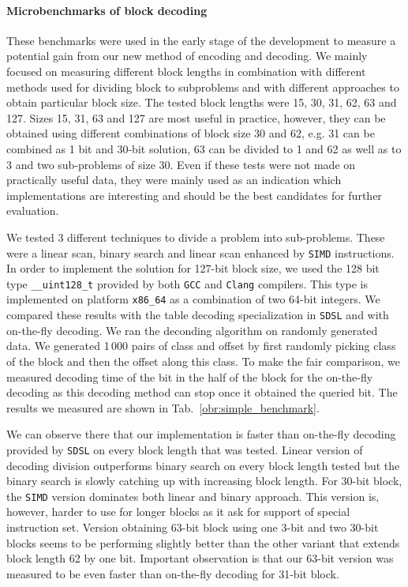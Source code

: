 \paragraph{Microbenchmarks of block decoding}

These benchmarks were used in the early stage of the development to measure a potential gain from
our new method of encoding and decoding. We mainly focused on measuring different block lengths
in combination with different methods used for dividing block to subproblems and with different
approaches to obtain particular block size. The tested block lengths were 15, 30, 31, 62, 63
and 127. Sizes 15, 31, 63 and 127 are most useful in practice, however, they can be obtained using
different combinations of block size 30 and 62, e.g. 31 can be combined as 1 bit and 30-bit solution,
63 can be divided to 1 and 62 as well as to 3 and two sub-problems of size 30. Even if these
tests were not made on practically useful data, they were mainly used as an indication which
implementations are interesting and should be the best candidates for further evaluation.

We tested 3 different techniques to divide a problem into sub-problems. These were a linear scan,
binary search and linear scan enhanced by \texttt{SIMD} instructions. In order to implement the
solution for 127-bit block size, we used the 128 bit type \texttt{\_\_uint128\_t} provided by both
\texttt{GCC} and \texttt{Clang} compilers. This type is implemented on platform \texttt{x86\_64}
as a combination of two 64-bit integers. We compared these results with the table decoding specialization
in \texttt{SDSL} and with on-the-fly decoding. We ran the deconding algorithm on randomly generated data.
We generated 1\,000 pairs of class and offset by first randomly picking class of the block and then the
offset along this class. To make the fair comparison, we measured decoding time of the bit in the half of
the block for the on-the-fly decoding as this decoding method can stop once it obtained the queried bit.
The results we measured are shown in Tab.~\ref{obr:simple_benchmark}.

We can observe there that our implementation is faster than on-the-fly decoding provided by \texttt{SDSL}
on every block length that was tested. Linear version of decoding division outperforms binary search on
every block length tested but the binary search is slowly catching up with increasing block length.
For 30-bit block, the \texttt{SIMD} version dominates both linear and binary approach. This version is,
however, harder to use for longer blocks as it ask for support of special instruction set. Version
obtaining 63-bit block using one 3-bit and two 30-bit blocks seems to be performing slightly better than
the other variant that extends block length 62 by one bit. Important observation is that our 63-bit
version was measured to be even faster than on-the-fly decoding for 31-bit block.

